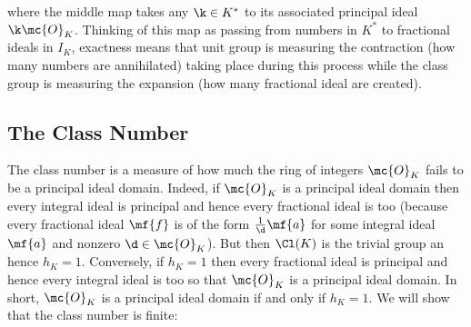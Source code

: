     \begin{center}
    \end{center}

    where the middle map takes any $\k \in K^{\ast}$ to its associated principal ideal $\k\mc{O}_{K}$. Thinking of this map as passing from numbers in $K^{\ast}$ to fractional ideals in $I_{K}$, exactness means that unit group is measuring the contraction (how many numbers are annihilated) taking place during this process while the class group is measuring the expansion (how many fractional ideal are created).
    \subsection*{The Class Number}
      The class number is a measure of how much the ring of integers $\mc{O}_{K}$ fails to be a principal ideal domain. Indeed, if $\mc{O}_{K}$ is a principal ideal domain then every integral ideal is principal and hence every fractional ideal is too (because every fractional ideal $\mf{f}$ is of the form $\frac{1}{\d}\mf{a}$ for some integral ideal $\mf{a}$ and nonzero $\d \in \mc{O}_{K}$). But then $\Cl(K)$ is the trivial group an hence $h_{K} = 1$. Conversely, if $h_{K} = 1$ then every fractional ideal is principal and hence every integral ideal is too so that $\mc{O}_{K}$ is a principal ideal domain. In short, $\mc{O}_{K}$ is a principal ideal domain if and only if $h_{K} = 1$. We will show that the class number is finite:

